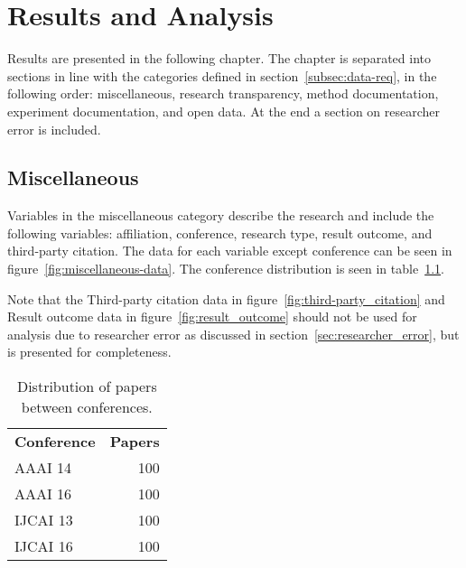 
\chapter{Results and Analysis}
Results are presented in the following chapter. The chapter is separated into sections in line with the categories defined in section~\ref{subsec:data-req}, in the following order: miscellaneous, research transparency, method documentation, experiment documentation,  and open data. At the end a section on researcher error is included.

\section{Miscellaneous}
Variables in the miscellaneous category describe the research and include the following variables: affiliation, conference, research type, result outcome, and third-party citation.
The data for each variable except conference can be seen in figure~\ref{fig:miscellaneous-data}. The conference distribution is seen in table~\ref{tab:conferences}.

Note that the Third-party citation data in figure~\ref{fig:third-party_citation} and Result outcome data in figure~\ref{fig:result_outcome} should not be used for analysis due to researcher error as discussed in section~\ref{sec:researcher_error}, but is presented for completeness.

\begin{table}[!h]
\begin{center}
    \begin{tabular}{ lr }
    \textbf{Conference} & \textbf{Papers} \\
    AAAI 14 & 100 \\
    AAAI 16 & 100 \\
    IJCAI 13 & 100 \\
    IJCAI 16 & 100 \\
    \end{tabular}
\end{center}
\caption{Distribution of papers between conferences.}
\label{tab:conferences}
\end{table}


